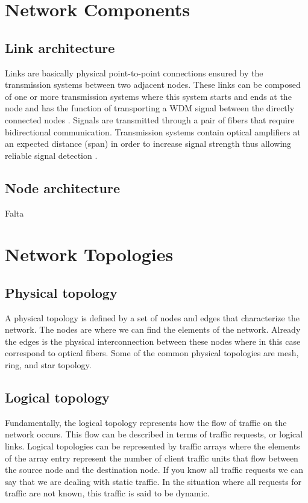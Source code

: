 \clearpage

\section{Network Components}\label{network_components}

\subsection{Link architecture}

Links are basically physical point-to-point connections ensured by the transmission systems between two adjacent nodes.
These links can be composed of one or more transmission systems where this system starts and ends at the node and has the function of transporting a WDM signal between the directly connected nodes \cite{book07}\cite{ramas2010}. Signals are transmitted through a pair of fibers that require bidirectional communication.
Transmission systems contain optical amplifiers at an expected distance (span) in order to increase signal strength thus allowing reliable signal detection \cite{tesevasco}.

\subsection{Node architecture}
Falta
\section{Network Topologies}\label{network_topologies}

\subsection{Physical topology}

A physical topology is defined by a set of nodes and edges that characterize the network. The nodes are where we can find the elements of the network. Already the edges is the physical interconnection between these nodes where in this case correspond to optical fibers.
Some of the common physical topologies are mesh, ring, and star topology.

\subsection{Logical topology}

Fundamentally, the logical topology represents how the flow of traffic on the network occurs. This flow can be described in terms of traffic requests, or logical links.
Logical topologies can be represented by traffic arrays where the elements of the array entry represent the number of client traffic units that flow between the source node and the destination node.
If you know all traffic requests we can say that we are dealing with static traffic. In the situation where all requests for traffic are not known, this traffic is said to be dynamic.


